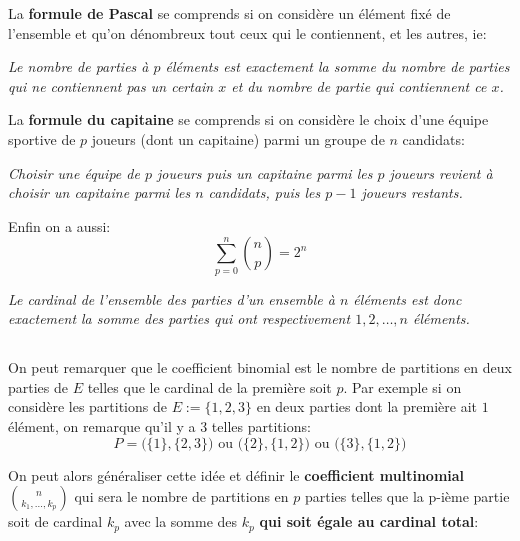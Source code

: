 La \textbf{formule de Pascal} se comprends si on considère un élément fixé de l'ensemble et qu'on dénombreux tout ceux qui le contiennent, et les autres, ie: 
\begin{center}
   \textit{Le nombre de parties à \(p\) éléments est exactement la somme du nombre de parties qui ne contiennent pas un certain \(x\) et du nombre de partie qui contiennent ce \(x\).}
\end{center} 

La \textbf{formule du capitaine} se comprends si on considère le choix d'une équipe sportive de \(p\) joueurs (dont un capitaine) parmi un groupe de \(n\) candidats:
\begin{center}
   \textit{Choisir une équipe de \(p\) joueurs puis un capitaine parmi les \(p\) joueurs\+ revient à choisir un capitaine parmi les \(n\) candidats, puis les \(p - 1\) joueurs restants.}
\end{center} 
Enfin on a aussi:
\[
   \sum_{p=0}^n \binom{n}{p} = 2^n       
\]
\begin{center}
   \textit{Le cardinal de l'ensemble des parties d'un ensemble à \(n\) éléments est donc exactement la somme des parties qui ont respectivement \(1, 2, \ldots, n\) éléments.}
\end{center} 

\subsection*{}
On peut remarquer que le coefficient binomial est le nombre de partitions en deux parties de \(E\) telles que le cardinal de la première soit \(p\). Par exemple si on considère les partitions de \(E := \bigl\{1, 2, 3\bigl\}\) en deux parties dont la première ait \(1\) élément, on remarque qu'il y a 3 telles partitions:
\[
   P = \bigl(\{1\}, \{2, 3\}\bigl) \text{ ou } \bigl(\{2\}, \{1, 2\}\bigl) \text{ ou } \bigl(\{3\}, \{1, 2\}\bigl)
\]

On peut alors généraliser cette idée et définir le \textbf{coefficient multinomial} \(\binom{n}{k_1, \ldots, k_p}\) qui sera le nombre de partitions en \(p\) parties telles que la p-ième partie soit de cardinal \(k_p\) avec la somme des \(k_p\) \textbf{qui soit égale au cardinal total}:


